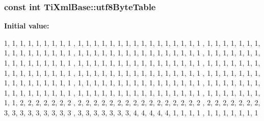 \hypertarget{classTiXmlBase_ac8c86058137bdb4b413c3eca58f2d467}{
\subsubsection[{utf8ByteTable}]{\setlength{\rightskip}{0pt plus 5cm}const int {\bf TiXmlBase::utf8ByteTable}}}
\label{d8/d47/classTiXmlBase_ac8c86058137bdb4b413c3eca58f2d467}
{\bfseries Initial value:}
\begin{DoxyCode}
 
{
        
                1,      1,      1,      1,      1,      1,      1,      1,      1
      ,       1,      1,      1,      1,      1,      1,      1,      
                1,      1,      1,      1,      1,      1,      1,      1,      1
      ,       1,      1,      1,      1,      1,      1,      1,      
                1,      1,      1,      1,      1,      1,      1,      1,      1
      ,       1,      1,      1,      1,      1,      1,      1,      
                1,      1,      1,      1,      1,      1,      1,      1,      1
      ,       1,      1,      1,      1,      1,      1,      1,      
                1,      1,      1,      1,      1,      1,      1,      1,      1
      ,       1,      1,      1,      1,      1,      1,      1,      
                1,      1,      1,      1,      1,      1,      1,      1,      1
      ,       1,      1,      1,      1,      1,      1,      1,      
                1,      1,      1,      1,      1,      1,      1,      1,      1
      ,       1,      1,      1,      1,      1,      1,      1,      
                1,      1,      1,      1,      1,      1,      1,      1,      1
      ,       1,      1,      1,      1,      1,      1,      1,      
                1,      1,      1,      1,      1,      1,      1,      1,      1
      ,       1,      1,      1,      1,      1,      1,      1,      
                1,      1,      1,      1,      1,      1,      1,      1,      1
      ,       1,      1,      1,      1,      1,      1,      1,      
                1,      1,      1,      1,      1,      1,      1,      1,      1
      ,       1,      1,      1,      1,      1,      1,      1,      
                1,      1,      1,      1,      1,      1,      1,      1,      1
      ,       1,      1,      1,      1,      1,      1,      1,      
                1,      1,      2,      2,      2,      2,      2,      2,      2
      ,       2,      2,      2,      2,      2,      2,      2,      
                2,      2,      2,      2,      2,      2,      2,      2,      2
      ,       2,      2,      2,      2,      2,      2,      2,      
                3,      3,      3,      3,      3,      3,      3,      3,      3
      ,       3,      3,      3,      3,      3,      3,      3,      
                4,      4,      4,      4,      4,      1,      1,      1,      1
      ,       1,      1,      1,      1,      1,      1,      1       
}
\end{DoxyCode}


